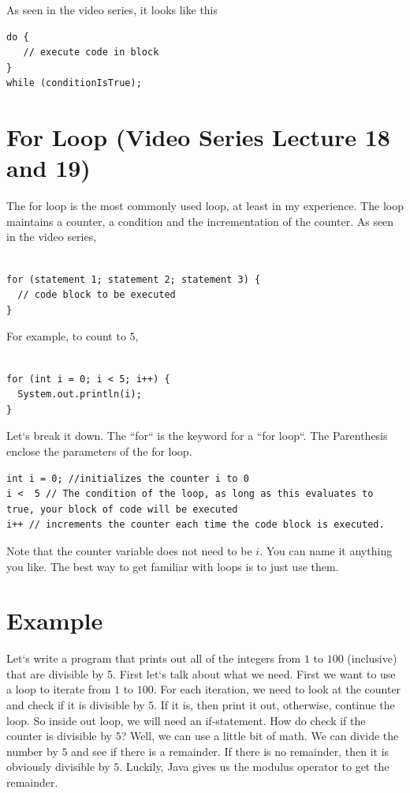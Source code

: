 \documentclass[11]{article}
\begin{document}
As seen in the video series, it looks like this

\begin{lstlisting}
do {
   // execute code in block
}
while (conditionIsTrue);
\end{lstlisting}
\section{For Loop (Video Series Lecture 18 and 19)}
The for loop is the most commonly used loop, at least in my experience. The loop maintains a counter, a condition and the incrementation of the counter. As seen in the video series, 
\begin{lstlisting}

for (statement 1; statement 2; statement 3) {
  // code block to be executed
}
\end{lstlisting}

For example, to count to $5$, 

\begin{lstlisting}

for (int i = 0; i < 5; i++) {
  System.out.println(i);
}
\end{lstlisting}

Let`s break it down. The ``for`` is the keyword for a ``for loop``. The Parenthesis enclose the parameters of the for loop.
\begin{lstlisting}
int i = 0; //initializes the counter i to 0
i <  5 // The condition of the loop, as long as this evaluates to true, your block of code will be executed
i++ // increments the counter each time the code block is executed.
\end{lstlisting}

Note that the counter variable does not need to be $i$. You can name it anything you like. The best way to get familiar with loops is to just use them.

\section{Example}
Let`s write a program that prints out all of the integers from $1$ to $100$ (inclusive) that are divisible by 5. First let`s talk about what we need. First we want to use a loop to iterate from $1$ to $100$. For each iteration, we need to look at the counter and check if it is divisible by $5$. If it is, then print it out, otherwise, continue the loop. So inside out loop, we will need an if-statement. How do check if the counter is divisible by $5$? Well, we can use a little bit of math. We can divide the number by $5$ and see if there is a remainder. If there is no remainder, then it is obviously divisible by $5$. Luckily, Java gives us the modulus operator to get the remainder. 
\end{document}
